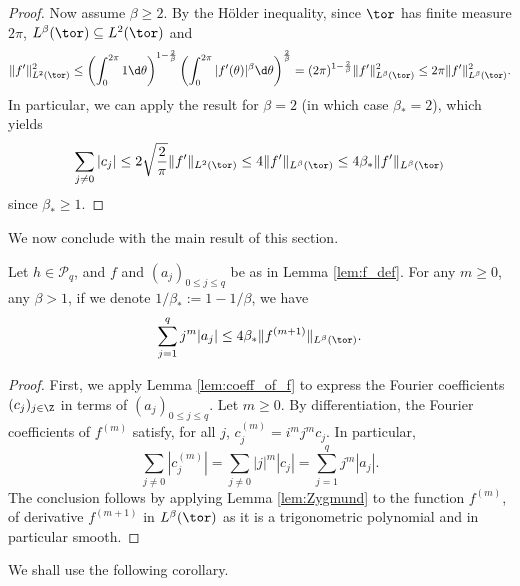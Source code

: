 \begin{proof}
  Now assume $\beta \geq 2$.
  By the H\"older inequality, since $\tor$ has finite measure $2 \pi$,
  $L^\beta(\tor) \subseteq L^2(\tor)$ and
  \begin{equation*}
    \|f'\|_{L^2(\tor)}^2
   \leq  \left(\int_0^{2 \pi} 1 \d \theta\right)^{1-\frac{2}{\beta}}
    \left(\int_0^{2 \pi} |f'(\theta)|^{\beta} \d \theta\right)^{\frac{2}{\beta}}
    = (2 \pi)^{1-\frac{2}{\beta}}  \|f'\|_{L^\beta(\tor)}^2
    \leq 2 \pi \|f'\|_{L^\beta(\tor)}^2.
  \end{equation*}
  In particular, we can apply the result for $\beta=2$ (in which case $\beta_*=2$),
  which yields
  \begin{equation*}
    \sum_{j \neq 0} |c_j|
    \leq 2 \sqrt{\frac{2}{\pi}}  \|f'\|_{L^2(\tor)}
    \leq 4 \|f'\|_{L^\beta(\tor)}
    \leq 4 \beta_*  \|f'\|_{L^\beta(\tor)}
  \end{equation*}
  since $\beta_* \geq 1$.
\end{proof}

We now conclude with the main result of this section.

\begin{lemma}
  \label{lem:bound_sum_aj}
  Let $h \in \mathcal{P}_q$, and $f$ and $(a_j)_{0 \leq j \leq q}$ be as in Lemma \ref{lem:f_def}.
  For any $m \geq 0$,
  any $\beta > 1$, if we denote $1/\beta_* := 1 - 1/\beta$, we have
  \begin{equation*}
    \sum_{j=1}^q j^m |a_j| \leq 4 \beta_* \|f^{(m+1)}\|_{L^\beta(\tor)}.
  \end{equation*}
\end{lemma}

\begin{proof}
  First, we apply Lemma \ref{lem:coeff_of_f} to express the Fourier coefficients
  $(c_j)_{j \in \Z}$ in terms of $(a_j)_{0 \leq j \leq q}$.
  Let $m \geq 0$. By differentiation,
  the Fourier coefficients of $f^{(m)}$ satisfy, for
  all $j$, $c_j^{(m)} =
    i^m j^m c_j$.
  In particular,
  \begin{equation*}
    \sum_{j \neq 0} |c_j^{(m)}|
    = \sum_{j \neq 0} |j|^m |c_j|
    = \sum_{j =1}^q j^m |a_j|.
  \end{equation*}
  The conclusion follows by applying Lemma \ref{lem:Zygmund} to the function $f^{(m)}$,
  of derivative $f^{(m+1)}$ in $L^\beta(\tor)$ as it is a trigonometric polynomial and in particular smooth.
\end{proof}

We shall use the following corollary.

